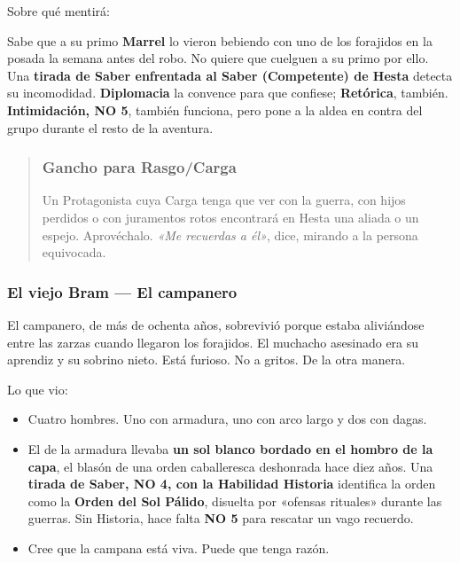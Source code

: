 \documentclass[10pt,a4paper]{article}
\newcommand{\tightlist}{\setlength{\itemsep}{0pt}\setlength{\parskip}{0pt}}
\begin{document}
Sobre qué mentirá:

Sabe que a su primo \textbf{Marrel} lo vieron bebiendo con uno de los forajidos en la posada la semana antes del robo. No quiere que cuelguen a su primo por ello. Una \textbf{tirada de Saber enfrentada al Saber (Competente) de Hesta} detecta su incomodidad. \textbf{Diplomacia} la convence para que confiese; \textbf{Retórica}, también. \textbf{Intimidación, NO 5}, también funciona, pero pone a la aldea en contra del grupo durante el resto de la aventura.

\begin{quote}
\subsubsection{Gancho para Rasgo/Carga}\label{gancho-para-rasgo-y-carga}

Un Protagonista cuya Carga tenga que ver con la guerra, con hijos perdidos o con juramentos rotos encontrará en Hesta una aliada o un espejo. Aprovéchalo. \emph{«Me recuerdas a él»}, dice, mirando a la persona equivocada.
\end{quote}

\subsubsection{El viejo Bram --- El campanero}\label{el-viejo-bram-el-campanero}

El campanero, de más de ochenta años, sobrevivió porque estaba aliviándose entre las zarzas cuando llegaron los forajidos. El muchacho asesinado era su aprendiz y su sobrino nieto. Está furioso. No a gritos. De la otra manera.

Lo que vio:

\begin{itemize}
\tightlist
\item
  Cuatro hombres. Uno con armadura, uno con arco largo y dos con dagas.
\item
  El de la armadura llevaba \textbf{un sol blanco bordado en el hombro de la capa}, el blasón de una orden caballeresca deshonrada hace diez años. Una \textbf{tirada de Saber, NO 4, con la Habilidad Historia} identifica la orden como la \textbf{Orden del Sol Pálido}, disuelta por «ofensas rituales» durante las guerras. Sin Historia, hace falta \textbf{NO 5} para rescatar un vago recuerdo.
\item
  Cree que la campana está viva. Puede que tenga razón.
\end{itemize}
\end{document}
